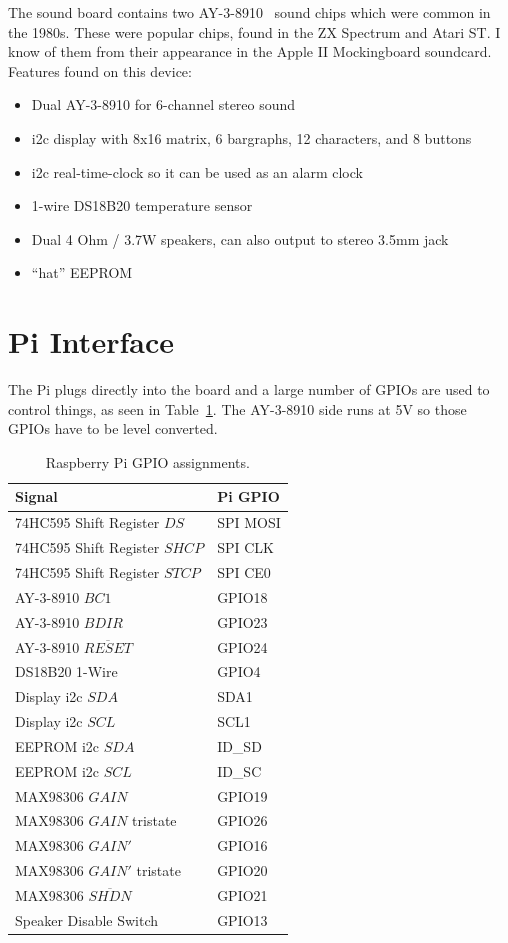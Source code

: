 \documentclass[11pt]{article}
\begin{document}
The sound board contains two AY-3-8910~\cite{ay38910} sound chips which
were common in the 1980s.
These were popular chips, found in the ZX Spectrum and Atari ST.
I know of them from their appearance in the Apple II Mockingboard soundcard.\\

\noindent
Features found on this device:
\begin{itemize}
\item Dual AY-3-8910 for 6-channel stereo sound
\item i2c display with 8x16 matrix, 6 bargraphs, 12 characters, 
	and 8 buttons
\item i2c real-time-clock so it can be used as an alarm clock
\item 1-wire DS18B20 temperature sensor
\item Dual 4 Ohm / 3.7W speakers, can also output to stereo 3.5mm jack
\item ``hat'' EEPROM 
\end{itemize}

\section{Pi Interface}

The Pi plugs directly into the board and a large number of GPIOs are
used to control things, as seen in Table~\ref{table:gpio}.
The AY-3-8910 side runs at 5V so those GPIOs have to be level converted.

\begin{table}[tbh]
\caption{Raspberry Pi GPIO assignments.\label{table:gpio}}
\centering
\begin{tabular}{|l|l|}
\hline
Signal	&	Pi GPIO \\
\hline
\hline
74HC595 Shift Register $DS$	&	SPI MOSI \\
74HC595 Shift Register $SHCP$	&	SPI CLK\\
74HC595 Shift Register $STCP$	& 	SPI CE0\\
\hline
AY-3-8910 $BC1$			&	GPIO18 \\
AY-3-8910 $BDIR$		&	GPIO23 \\
AY-3-8910 $\overline{RESET}$	&	GPIO24 \\
\hline
DS18B20 1-Wire			&	GPIO4\\
\hline
Display i2c $SDA$		&	SDA1	\\
Display i2c $SCL$		&	SCL1	\\
\hline
EEPROM i2c $SDA$		&	ID\_SD	\\
EEPROM i2c $SCL$		&	ID\_SC	\\
\hline
MAX98306 $GAIN$			&	GPIO19 \\
MAX98306 $GAIN$ tristate	&	GPIO26 \\
MAX98306 $GAIN'$		&	GPIO16 \\
MAX98306 $GAIN'$ tristate	&	GPIO20 \\
MAX98306 $\overline{SHDN}$	&	GPIO21 \\
Speaker Disable Switch		&	GPIO13 \\
\hline
\end{tabular}
\end{table}
\end{document}
